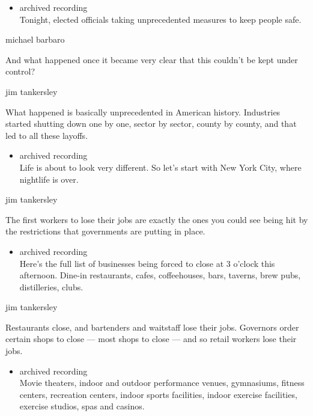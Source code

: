 \begin{itemize}
\tightlist
\item
  archived recording\\
  Tonight, elected officials taking unprecedented measures to keep
  people safe.
\end{itemize}

michael barbaro

And what happened once it became very clear that this couldn't be kept
under control?

jim tankersley

What happened is basically unprecedented in American history. Industries
started shutting down one by one, sector by sector, county by county,
and that led to all these layoffs.

\begin{itemize}
\tightlist
\item
  archived recording\\
  Life is about to look very different. So let's start with New York
  City, where nightlife is over.
\end{itemize}

jim tankersley

The first workers to lose their jobs are exactly the ones you could see
being hit by the restrictions that governments are putting in place.

\begin{itemize}
\tightlist
\item
  archived recording\\
  Here's the full list of businesses being forced to close at 3 o'clock
  this afternoon. Dine-in restaurants, cafes, coffeehouses, bars,
  taverns, brew pubs, distilleries, clubs.
\end{itemize}

jim tankersley

Restaurants close, and bartenders and waitstaff lose their jobs.
Governors order certain shops to close --- most shops to close --- and
so retail workers lose their jobs.

\begin{itemize}
\tightlist
\item
  archived recording\\
  Movie theaters, indoor and outdoor performance venues, gymnasiums,
  fitness centers, recreation centers, indoor sports facilities, indoor
  exercise facilities, exercise studios, spas and casinos.
\end{itemize}

